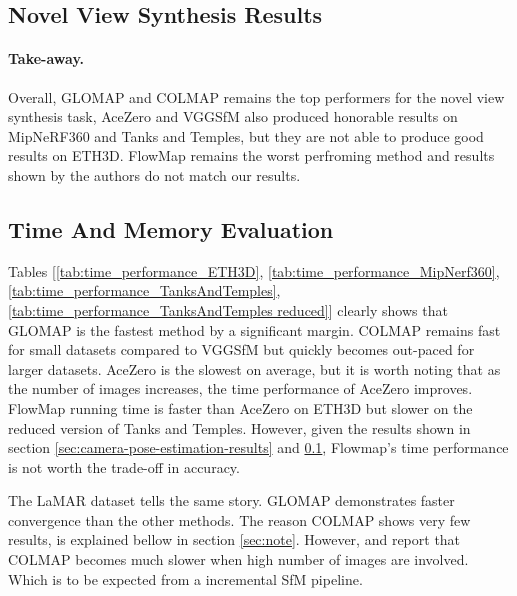 \subsection{Novel View Synthesis Results}\label{sec:gs-evaluation-results}




\paragraph{Take-away.}
Overall, GLOMAP and COLMAP remains the top performers for the novel view synthesis task, 
AceZero and VGGSfM also produced honorable results on MipNeRF360 and Tanks and Temples, but they are not able to produce good results on ETH3D.
FlowMap remains the worst perfroming method and results shown by the authors do not match our results.

\subsection{Time And Memory Evaluation}\label{sec:time-and-memory-evaluation}







Tables [\ref{tab:time_performance_ETH3D}, \ref{tab:time_performance_MipNerf360}, \ref{tab:time_performance_TanksAndTemples}, \ref{tab:time_performance_TanksAndTemples reduced}]
clearly shows that GLOMAP is the fastest method by a significant margin.
COLMAP remains fast for small datasets compared to VGGSfM but quickly becomes out-paced for larger datasets.
AceZero is the slowest on average, but it is worth noting that as the number of images increases, the time performance of AceZero improves.
FlowMap running time is faster than AceZero on ETH3D but slower on the reduced version of Tanks and Temples.
However, given the results shown in section \ref{sec:camera-pose-estimation-results} and \ref{sec:gs-evaluation-results}, Flowmap's time performance is not worth the trade-off in accuracy.





The LaMAR dataset tells the same story. GLOMAP demonstrates faster convergence than the other methods. 
The reason COLMAP shows very few results, is explained bellow in section \ref{sec:note}. However, \cite{pan2024glomap} and \cite{brachmann2024acezero} report that COLMAP becomes much slower when high number of images are involved. 
Which is to be expected from a incremental SfM pipeline.

